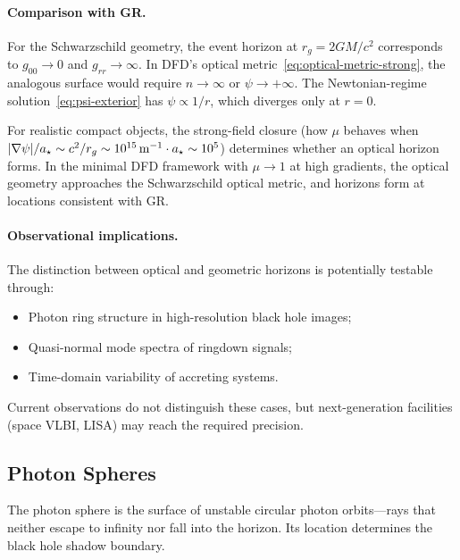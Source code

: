 \paragraph{Comparison with GR.}
For the Schwarzschild geometry, the event horizon at $r_g = 2GM/c^2$ corresponds to $g_{00} \to 0$ and $g_{rr} \to \infty$. In DFD's optical metric~\eqref{eq:optical-metric-strong}, the analogous surface would require $n \to \infty$ or $\psi \to +\infty$. The Newtonian-regime solution~\eqref{eq:psi-exterior} has $\psi \propto 1/r$, which diverges only at $r = 0$.

For realistic compact objects, the strong-field closure (how $\mu$ behaves when $|\nabla\psi|/a_\star \sim c^2/r_g \sim 10^{15}\,\text{m}^{-1} \cdot a_\star \sim 10^{5}$) determines whether an optical horizon forms. In the minimal DFD framework with $\mu \to 1$ at high gradients, the optical geometry approaches the Schwarzschild optical metric, and horizons form at locations consistent with GR.

\paragraph{Observational implications.}
The distinction between optical and geometric horizons is potentially testable through:
\begin{itemize}
\item Photon ring structure in high-resolution black hole images;
\item Quasi-normal mode spectra of ringdown signals;
\item Time-domain variability of accreting systems.
\end{itemize}
Current observations do not distinguish these cases, but next-generation facilities (space VLBI, LISA) may reach the required precision.

\subsection{Photon Spheres}\label{sec:strong-photon}

The photon sphere is the surface of unstable circular photon orbits---rays that neither escape to infinity nor fall into the horizon. Its location determines the black hole shadow boundary.


